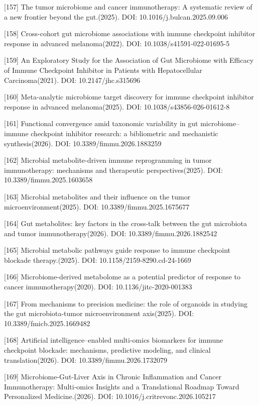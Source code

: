 \documentclass[11pt]{article}
\begin{document}
{[}157{]} The tumor microbiome and cancer immunotherapy: A systematic review of a new frontier beyond the gut.(2025). DOI: 10.1016/j.bulcan.2025.09.006

{[}158{]} Cross-cohort gut microbiome associations with immune checkpoint inhibitor response in advanced melanoma(2022). DOI: 10.1038/s41591-022-01695-5

{[}159{]} An Exploratory Study for the Association of Gut Microbiome with Efficacy of Immune Checkpoint Inhibitor in Patients with Hepatocellular Carcinoma(2021). DOI: 10.2147/jhc.s315696

{[}160{]} Meta-analytic microbiome target discovery for immune checkpoint inhibitor response in advanced melanoma(2025). DOI: 10.1038/s43856-026-01612-8

{[}161{]} Functional convergence amid taxonomic variability in gut microbiome--immune checkpoint inhibitor research: a bibliometric and mechanistic synthesis(2026). DOI: 10.3389/fimmu.2026.1883259

{[}162{]} Microbial metabolite-driven immune reprogramming in tumor immunotherapy: mechanisms and therapeutic perspectives(2025). DOI: 10.3389/fimmu.2025.1603658

{[}163{]} Microbial metabolites and their influence on the tumor microenvironment(2025). DOI: 10.3389/fimmu.2025.1675677

{[}164{]} Gut metabolites: key factors in the cross-talk between the gut microbiota and tumor immunotherapy(2026). DOI: 10.3389/fimmu.2026.1882542

{[}165{]} Microbial metabolic pathways guide response to immune checkpoint blockade therapy.(2025). DOI: 10.1158/2159-8290.cd-24-1669

{[}166{]} Microbiome-derived metabolome as a potential predictor of response to cancer immunotherapy(2020). DOI: 10.1136/jitc-2020-001383

{[}167{]} From mechanisms to precision medicine: the role of organoids in studying the gut microbiota-tumor microenvironment axis(2025). DOI: 10.3389/fmicb.2025.1669482

{[}168{]} Artificial intelligence--enabled multi-omics biomarkers for immune checkpoint blockade: mechanisms, predictive modeling, and clinical translation(2026). DOI: 10.3389/fimmu.2026.1732079

{[}169{]} Microbiome-Gut-Liver Axis in Chronic Inflammation and Cancer Immunotherapy: Multi-omics Insights and a Translational Roadmap Toward Personalized Medicine.(2026). DOI: 10.1016/j.critrevonc.2026.105217
\end{document}
